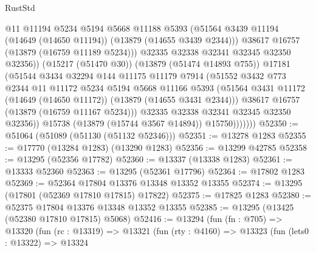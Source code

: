 \begin{lexlean}{RustStd}
\begin{coremodule}
                          @11
                          @11194
                          @5234
                          @5194
                          @5668
                          @11188
                          @5393
                          (@51564
                            @3439
                            @11194
                            (@14649 (@14650 @11194))
                            (@13879 (@14655 @3439 @2344)))
                          @38617
                          @16757
                          (@13879 (@16759 @11189 @5234)))
                        @32335
                        @32338
                        @32341
                        @32345
                        @32350
                        @32356))
                    (@15217 (@51470 @30))
                    (@13879 (@51474 @14893 @755))
                    @17181
                    (@51544
                      @3434
                      @32294
                      @144
                      @11175
                      @11179
                      @7914
                      (@51552
                        @3432
                        @773
                        @2344
                        @11
                        @11172
                        @5234
                        @5194
                        @5668
                        @11166
                        @5393
                        (@51564 @3431 @11172 (@14649 (@14650 @11172)) (@13879 (@14655 @3431 @2344)))
                        @38617
                        @16757
                        (@13879 (@16759 @11167 @5234)))
                      @32335
                      @32338
                      @32341
                      @32345
                      @32350
                      @32356))
                  @15738
                  (@13879 (@15744 @3567 @14894))
                  @15750)))))))
@52350 := @51064 (@51089 (@51130 (@51132 @52346)))
@52351 := @13278 @1283
@52355 := @17770 (@13284 @1283) (@13290 @1283)
@52356 := @13299 @42785
@52358 := @13295 (@52356 @17782)
@52360 := @13337 (@13338 @1283)
@52361 := @13333 @52360
@52363 := @13295 (@52361 @17796)
@52364 := @17802 @1283
@52369 := @52364 @17804 @13376 @13348 @13352 @13355
@52374 := @13295 (@17801 (@52369 @17810 @17815) @17822)
@52375 := @17825 @1283
@52380 := @52375 @17804 @13376 @13348 @13352 @13355
@52385 := @13295 (@13425 (@52380 @17810 @17815) @5068)
@52416 := @13294
    (fun (fn : @705) =>
    @13320
      (fun (rc : @13319) =>
      @13321
        (fun (rty : @4160) =>
        @13323
          (fun (lets0 : @13322) =>
          @13324

\end{coremodule}
\end{lexlean}
